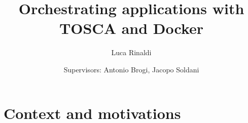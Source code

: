 \documentclass{beamer}
\title[About Beamer] %
{Orchestrating applications with\\ TOSCA and Docker}
\author[Candidate: Rinaldi] %
{Luca Rinaldi}
\institute[] %
{
  {\small
  MSc in Computer Science and Networking
  \\
  University of Pisa and Sant'Anna School of Advanced Studies}
  \\
  A.Y. 2015/2016
}
\date[2016] %
{
  \small
  Supervisors: Antonio Brogi, Jacopo Soldani
}
\begin{document}
\begin{frame}
  \maketitle
\end{frame}


\section{Context and motivations}\subsection{}
\end{document}
